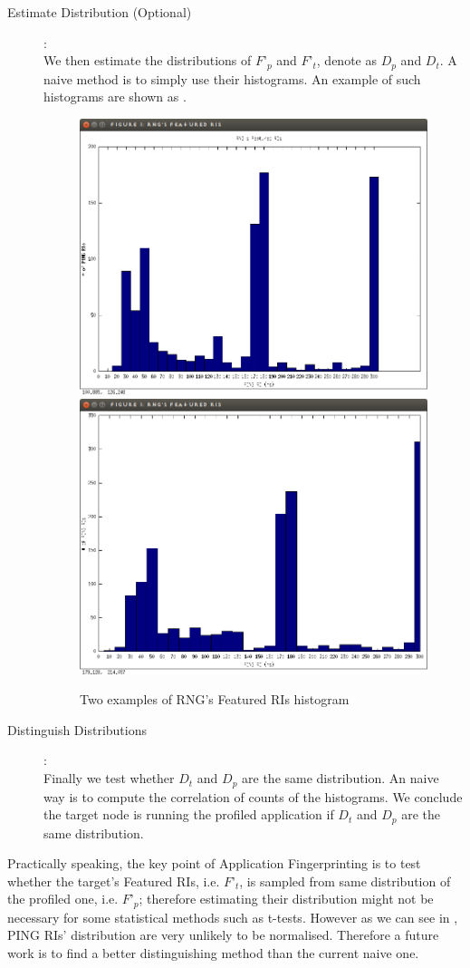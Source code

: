 \begin{description}
\item[Estimate Distribution (Optional)]: \hfill\\
We then estimate the distributions of $F’_p$ and $F’_t$, denote as $D_p$ and $D_t$. A naive method is to simply use their histograms. An example of such histograms are shown as .

\begin{figure}
\center
{
	\includegraphics[width=0.49 \textwidth]{fig/featuredri_rng1.png}
	\includegraphics[width=0.49 \textwidth]{fig/featuredri_rng2.png}
}
\caption{Two examples of RNG’s Featured RIs histogram}
\label{Fig: featuredri_rng}
\end{figure}

\item[Distinguish Distributions]: \hfill\\
Finally we test whether $D_t$ and $D_p$ are the same distribution. An naive way is to compute the correlation of counts of the histograms. We conclude the target node is running the profiled application if $D_t$ and $D_p$ are the same distribution.
\end{description}

Practically speaking, the key point of Application Fingerprinting is to test whether the target’s Featured RIs, i.e. $F’_t$, is sampled from same distribution of the profiled one, i.e. $F’_p$; therefore estimating their distribution might not be necessary for some statistical methods such as t-tests. However as we can see in , PING RIs’ distribution are very unlikely to be normalised. Therefore a future work is to find a better distinguishing method than the current naive one.

